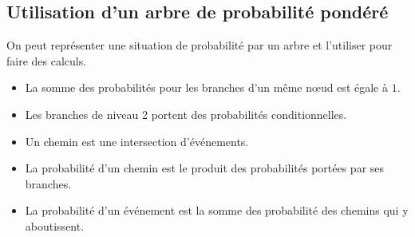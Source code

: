 \documentclass[12pt,a4paper]{article}
\begin{document}
\subsection{Utilisation d'un arbre de probabilité pondéré}	
\begin{mymeth}
	On peut représenter une situation de probabilité par un arbre et l'utiliser pour faire des calculs.\\
	\begin{itemize}
		\item La somme des probabilités pour les branches d'un même n\oe ud est égale à $1$.
		\item Les branches de niveau 2 portent des probabilités conditionnelles.
		\item Un chemin est une intersection d'événements.
		\item La probabilité d'un chemin est le produit des probabilités portées par ses branches.
		\item La probabilité d'un événement est la somme des probabilité des chemins qui y aboutissent.
	\end{itemize}

	
\end{mymeth}
	


\end{document}
